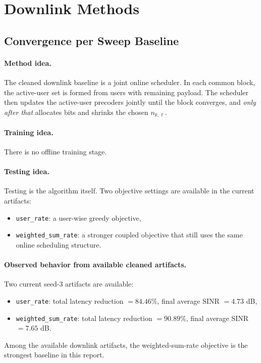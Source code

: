 \documentclass[11pt]{article}
\begin{document}
\section{Downlink Methods}
\subsection{Convergence per Sweep Baseline}
\paragraph{Method idea.}
The cleaned downlink baseline is a joint online scheduler. In each common block, the active-user set is formed from users with remaining payload. The scheduler then updates the active-user precoders jointly until the block converges, and \emph{only after that} allocates bits and shrinks the chosen \(n_{k,\ell}\).

\paragraph{Training idea.}
There is no offline training stage.

\paragraph{Testing idea.}
Testing is the algorithm itself. Two objective settings are available in the current artifacts:
\begin{itemize}[leftmargin=1.5em]
    \item \texttt{user\_rate}: a user-wise greedy objective,
    \item \texttt{weighted\_sum\_rate}: a stronger coupled objective that still uses the same online scheduling structure.
\end{itemize}

\paragraph{Observed behavior from available cleaned artifacts.}
Two current seed-3 artifacts are available:
\begin{itemize}[leftmargin=1.5em]
    \item \texttt{user\_rate}: total latency reduction \(= 84.46\%\), final average SINR \(= 4.73\) dB,
    \item \texttt{weighted\_sum\_rate}: total latency reduction \(= 90.89\%\), final average SINR \(= 7.65\) dB.
\end{itemize}
Among the available downlink artifacts, the weighted-sum-rate objective is the strongest baseline in this report.
\end{document}

